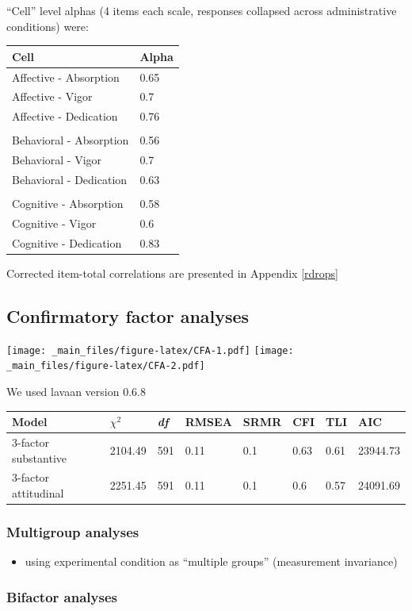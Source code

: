 \documentclass[
]{book}
\providecommand{\tightlist}{%
  \setlength{\itemsep}{0pt}\setlength{\parskip}{0pt}}
\begin{document}
``Cell'' level alphas (4 items each scale, responses collapsed across administrative conditions) were:

\begin{longtable}[]{@{}ll@{}}
\toprule
Cell & Alpha\tabularnewline
\midrule
\endhead
Affective - Absorption & 0.65\tabularnewline
Affective - Vigor & 0.7\tabularnewline
Affective - Dedication & 0.76\tabularnewline
&\tabularnewline
Behavioral - Absorption & 0.56\tabularnewline
Behavioral - Vigor & 0.7\tabularnewline
Behavioral - Dedication & 0.63\tabularnewline
&\tabularnewline
Cognitive - Absorption & 0.58\tabularnewline
Cognitive - Vigor & 0.6\tabularnewline
Cognitive - Dedication & 0.83\tabularnewline
\bottomrule
\end{longtable}

Corrected item-total correlations are presented in Appendix \ref{rdrops}

\hypertarget{confirmatory-factor-analyses}{%
\subsection{Confirmatory factor analyses}\label{confirmatory-factor-analyses}}

\texttt{[image: \_main\_files/figure-latex/CFA-1.pdf]} \texttt{[image: \_main\_files/figure-latex/CFA-2.pdf]}

We used lavaan version 0.6.8

\begin{longtable}[]{@{}llllllll@{}}
\toprule
Model & \(\chi^2\) & \emph{df} & RMSEA & SRMR & CFI & TLI & AIC\tabularnewline
\midrule
\endhead
3-factor substantive & 2104.49 & 591 & 0.11 & 0.1 & 0.63 & 0.61 & 23944.73\tabularnewline
3-factor attitudinal & 2251.45 & 591 & 0.11 & 0.1 & 0.6 & 0.57 & 24091.69\tabularnewline
\bottomrule
\end{longtable}

\hypertarget{multigroup-analyses}{%
\subsubsection{Multigroup analyses}\label{multigroup-analyses}}

\begin{itemize}
\tightlist
\item
  using experimental condition as ``multiple groups'' (measurement invariance)
\end{itemize}

\hypertarget{bifactor-analyses}{%
\subsubsection{Bifactor analyses}\label{bifactor-analyses}}
\end{document}
